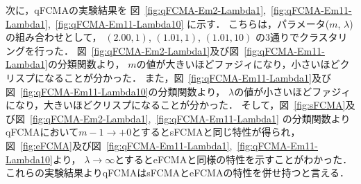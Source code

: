 \documentclass[a4j,12pt,dvipdfmx,oneside]{jsbook}
\theoremstyle{definition}
\begin{document}
  次に，qFCMAの実験結果を
  図~\ref{fig:qFCMA-Em2-Lambda1},~\ref{fig:qFCMA-Em11-Lambda1},~\ref{fig:qFCMA-Em11-Lambda10}
  に示す．
  こちらは，パラメータ($m$, $\lambda$)の組み合わせとして，
  $(2.00, 1)$, $(1.01, 1)$, $(1.01, 10)$
  の3通りでクラスタリングを行った．
  図~\ref{fig:qFCMA-Em2-Lambda1}及び図~\ref{fig:qFCMA-Em11-Lambda1}の分類関数より，
  $m$の値が大きいほどファジィになり，小さいほどクリスプになることが分かった．
  また，図~\ref{fig:qFCMA-Em11-Lambda1}及び図~\ref{fig:qFCMA-Em11-Lambda10}の分類関数より，
  $\lambda$の値が小さいほどファジィになり，大きいほどクリスプになることが分かった．
  そして，図~\ref{fig:sFCMA}及び図~\ref{fig:qFCMA-Em2-Lambda1},~\ref{fig:qFCMA-Em11-Lambda1}
  の分類関数よりqFCMAにおいて$m-1\rightarrow+0$とするとsFCMAと同じ特性が得られ，
  図~\ref{fig:eFCMA}及び図~\ref{fig:qFCMA-Em11-Lambda1},~\ref{fig:qFCMA-Em11-Lambda10}より，
  $\lambda\rightarrow\infty$とするとeFCMAと同様の特性を示すことがわかった．
  これらの実験結果よりqFCMAはsFCMAとeFCMAの特性を併せ持つと言える．
\end{document}
